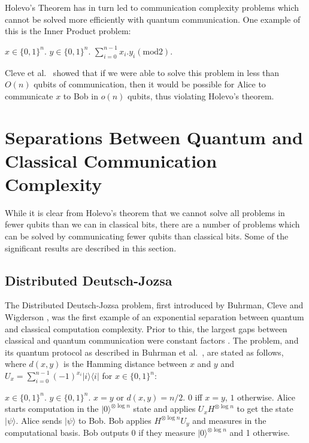 \documentclass[a4paper]{article}
\begin{document}
        Holevo's Theorem has in turn led to communication complexity problems which cannot be solved more efficiently with quantum communication. One example of this is the Inner Product problem:

        \begin{codebox}
            \zi {} $x \in \{0, 1\}^n$.
            \zi {} $y \in \{0, 1\}^n$.
            \zi {} $\sum_{i = 0}^{n - 1}x_i.y_i (\textrm{mod} 2)$.
        \end{codebox}

        Cleve et al.~\cite{Cleve201311} showed that if we were able to solve this problem in less than $O(n)$ qubits of communication, then it would be possible for Alice to communicate $x$ to Bob in $o(n)$ qubits, thus violating Holevo's theorem.

    \section{Separations Between Quantum and Classical Communication Complexity}
    \label{sec:separations}

        While it is clear from Holevo's theorem that we cannot solve all problems in fewer qubits than we can in classical bits, there are a number of problems which can be solved by communicating fewer qubits than classical bits. Some of the significant results are described in this section.

        \subsection{Distributed Deutsch-Jozsa}

        The Distributed Deutsch-Jozsa problem, first introduced by Buhrman, Cleve and Wigderson \cite{Buhrman:1998:QVC:276698.276713}, was the first example of an exponential separation between quantum and classical computation complexity. Prior to this, the largest gaps between classical and quantum communication were constant factors \cite{PhysRevA.56.1201}. The problem, and its quantum protocol as described in Buhrman et al.~\cite{RevModPhys.82.665}, are stated as follows, where $d(x, y)$ is the Hamming distance between $x$ and $y$ and $U_x = \sum_{i=0}^{n-1}(-1)^{x_i}|i\rangle\langle i|$ for $x \in \{0, 1\}^n$:

        \begin{codebox}
            \zi {} $x \in \{0, 1\}^n$.
            \zi {} $y \in \{0, 1\}^n$.
            \zi {} $x = y$ or $d(x, y) = n/2$.
            \zi {} $0$ iff $x = y$, $1$ otherwise.
            \li Alice starts computation in the $|0\rangle^{\otimes \log n}$ state and applies $U_xH^{\otimes \log n}$ to get the state $|\psi\rangle$.
            \li Alice sends $|\psi\rangle$ to Bob.
            \li Bob applies $H^{\otimes \log n}U_y$ and measures in the computational basis.
            \li Bob outputs $0$ if they measure $|0\rangle^{\otimes \log n}$ and 1 otherwise.
            \End
        \end{codebox}
\end{document}
